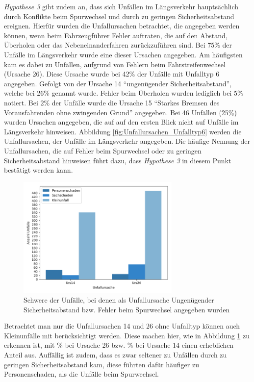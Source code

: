 \textit{Hypothese 3} gibt zudem an, dass sich Unfällen im Längsverkehr hauptsächlich durch Konflikte beim Spurwechsel und durch zu geringen Sicherheitsabstand ereignen. Hierfür wurden die Unfallursachen betrachtet, die angegeben werden können, wenn beim Fahrzeugführer Fehler auftraten, die auf den Abstand, Überholen oder das Nebeneinanderfahren zurückzuführen sind. Bei 75\% der Unfälle im Längsverkehr wurde eine dieser Ursachen angegeben. Am häufigsten kam es dabei zu Unfällen, aufgrund von Fehlern beim Fahrstreifenwechsel (Ursache 26). Diese Ursache wurde bei 42\% der Unfälle mit Unfalltyp 6 angegeben. Gefolgt von der Ursache 14 \enquote{ungenügender Sicherheitsabstand}, welche bei 26\% genannt wurde. Fehler beim Überholen wurden lediglich bei 5\% notiert. Bei 2\% der Unfälle wurde die Ursache 15 \enquote{Starkes Bremsen des Vorausfahrenden ohne zwingenden Grund} angegeben. Bei 46 Unfällen (25\%) wurden Ursachen angegeben, die auf auf den ersten Blick nicht auf Unfälle im Längsverkehr hinweisen. Abbildung \ref{fig:Unfallursachen_Unfalltyp6} werden die Unfallursachen, der Unfälle im Längsverkehr angegeben. Die häufige Nennung der Unfallursachen, die auf Fehler beim Spurwechsel oder zu geringen Sicherheitsabstand hinweisen führt dazu, dass \textit{Hypothese 3} in diesem Punkt bestätigt werden kann.

\begin{savenotes}
	\begin{figure}[H]
		\centering
		\includegraphics[width=8cm,height=6cm]{figures/Urs14_Urs26_Md}
		\caption[Schwere der Unfälle, bei denen als Unfallursache Ungenügender Sicherheitsabstand bzw. Fehler beim Spurwechsel angegeben wurden]{Schwere der Unfälle, bei denen als Unfallursache Ungenügender Sicherheitsabstand bzw. Fehler beim Spurwechsel angegeben wurden}\label{fig:Unfallursachen_14_26}
	\end{figure}
\end{savenotes}

Betrachtet man nur die Unfallursachen 14 und 26 ohne Unfalltyp können auch Kleinunfälle mit berücksichtigt werden. Diese machen hier, wie in Abbildung \ref{fig:Unfallursachen_14_26} zu erkennen ist, mit \% bei Ursache 26 bzw. \% bei Ursache 14 einen erheblichen Anteil aus. Auffällig ist zudem, dass es zwar seltener zu Unfällen durch zu geringen Sicherheitsabstand kam, diese führten dafür häufiger zu Personenschaden, als die Unfälle beim Spurwechsel.

